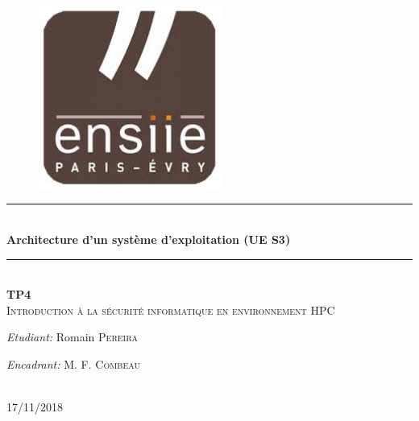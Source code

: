 \documentclass[10pt]{article}
\newcommand{\HRule}{\rule{\linewidth}{0.5mm}}
\begin{document}
    
    \begin{titlepage}
        \begin{sffamily}
            \begin{center}

                \begin{figure}[h!]
                    \includegraphics[width=6cm]{ensiie.jpeg}
                \end{figure}

                \HRule \\[0.8cm]
                { \huge \bfseries Architecture d'un système d'exploitation (UE S3) } \\[0.4cm]
                \HRule \\[2.0cm]
                
                { \huge \bfseries TP4 } \\[0.5cm]

                \textsc{\Large Introduction à la sécurité informatique en environnement HPC}\\[2.0cm]

                \vfill
                \begin{minipage}{0.4\textwidth}
                    \begin{flushleft} \large
                        \emph{Etudiant:} Romain \textsc{Pereira}\\
                    \end{flushleft}
                \end{minipage}
                \begin{minipage}{0.4\textwidth}
                    \begin{flushright} \large
                        \emph{Encadrant:}  M. F. \textsc{Combeau}
                    \end{flushright}
                \end{minipage}
                \\[2.0cm]
                {\large 17/11/2018}
            \end{center}
        \end{sffamily}
    \end{titlepage}
    
\end{document}
